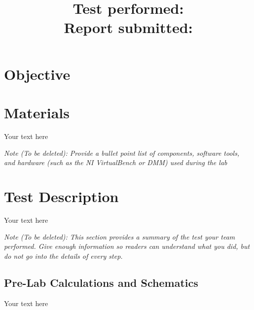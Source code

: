 \documentclass[10pt]{article}
\title{
    \textbf{\courseTitle} \\
    \textbf{\documentTitle} \\
    \bigskip
    \textbf{\large{Test performed: \testDate}} \\
    \textbf{\large{Report submitted: \reportDate}} \\
    \bigskip
    \bigskip
}
\author{\documentAuthor}
\date{}
\begin{document}
\maketitle

\newpage

\section{Objective}



\medskip



\section{Materials}

Your text here

\medskip

\textit{Note (To be deleted): Provide a bullet point list of components, software tools, and hardware (such as the NI VirtualBench or DMM) used during the lab}

\section{Test Description}

Your text here

\medskip

\textit{Note (To be deleted): This section provides a summary of the test your team performed. Give enough information so readers can understand what you did, but do not go into the details of every step.}

\subsection{Pre-Lab Calculations and Schematics}

Your text here
\end{document}
